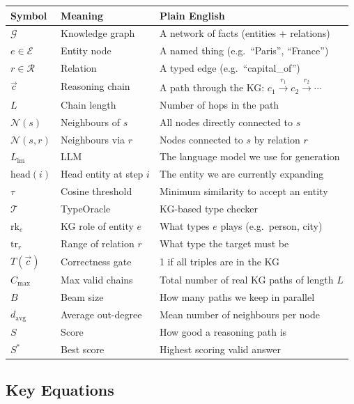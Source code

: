 \documentclass[11pt,a4paper]{article}
\begin{document}
\begin{center}
\begin{tabular}{@{}lll@{}}
\toprule
Symbol & Meaning & Plain English \\
\midrule
$\mathcal{G}$ & Knowledge graph & A network of facts (entities + relations) \\
$e \in \mathcal{E}$ & Entity node & A named thing (e.g.\ ``Paris'', ``France'') \\
$r \in \mathcal{R}$ & Relation & A typed edge (e.g.\ ``capital\_of'') \\
$\vec{c}$ & Reasoning chain & A path through the KG: $c_1 \xrightarrow{r_1} c_2 \xrightarrow{r_2} \cdots$ \\
$L$ & Chain length & Number of hops in the path \\
$\mathcal{N}(s)$ & Neighbours of $s$ & All nodes directly connected to $s$ \\
$\mathcal{N}(s,r)$ & Neighbours via $r$ & Nodes connected to $s$ by relation $r$ \\
$L_{\text{lm}}$ & LLM & The language model we use for generation \\
$\text{head}(i)$ & Head entity at step $i$ & The entity we are currently expanding \\
$\tau$ & Cosine threshold & Minimum similarity to accept an entity \\
$\mathcal{T}$ & TypeOracle & KG-based type checker \\
$\text{rk}_e$ & KG role of entity $e$ & What types $e$ plays (e.g.\ person, city) \\
$\text{tr}_r$ & Range of relation $r$ & What type the target must be \\
$T(\vec{c})$ & Correctness gate & 1 if all triples are in the KG \\
$C_{\text{max}}$ & Max valid chains & Total number of real KG paths of length $L$ \\
$B$ & Beam size & How many paths we keep in parallel \\
$d_{\text{avg}}$ & Average out-degree & Mean number of neighbours per node \\
$S$ & Score & How good a reasoning path is \\
$S^*$ & Best score & Highest scoring valid answer \\
\bottomrule
\end{tabular}
\end{center}

\subsection*{Key Equations}
\end{document}
